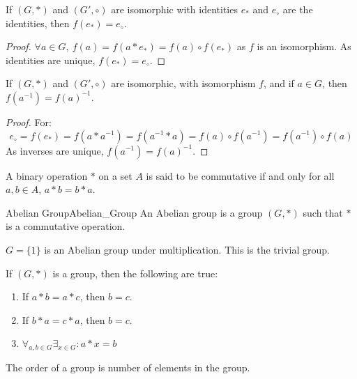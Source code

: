     \begin{theorem}
        If $(G,*)$ and $(G',\circ)$ are isomorphic with identities $e_{*}$
        and $e_{\circ}$ are the identities, then $f(e_{*})=e_{\circ}$.
    \end{theorem}
    \begin{proof}
        $\forall a\in G,\ f(a)=f(a* e_*) = f(a)\circ f(e_*)$ as $f$ is
        an isomorphism. As identities are unique, $f(e_*)=e_{\circ}$.
    \end{proof}
    \begin{theorem}
        If $(G,*)$ and $(G',\circ)$ are isomorphic, with isomorphism $f$, and if
        $a\in{G}$, then $f(a^{\minus{1}})=f(a)^{\minus{1}}$.
    \end{theorem}
    \begin{proof}
        For:
        \begin{equation}
            e_{\circ}=f(e_*)
                     =f(a*a^{-1})
                     =f(a^{-1}*a)
                     =f(a)\circ f(a^{-1})
                     =f(a^{-1})\circ f(a)
        \end{equation}
        As inverses are unique, $f(a^{-1})=f(a)^{-1}$.
    \end{proof}
    \begin{definition}
    A binary operation $*$ on a set $A$ is said to be commutative if and only for all $a,b\in A$, $a*b = b*a$.
    \end{definition}
    \begin{fdefinition}{Abelian Group}{Abelian_Group}
        An \gls{Abelian group} is a \gls{group} $(G,*)$ such that $*$ is
        a \gls{commutative operation}.
    \end{fdefinition}
    \begin{example}
        $G=\{1\}$ is an Abelian group under multiplication.
        This is the trivial group.
    \end{example}
    \begin{theorem}
        If $(G,*)$ is a group, then the following are true:
        \begin{enumerate}
            \item If $a*b=a*c$, then $b=c$.
            \item If $b*a=c*a$, then $b=c$.
            \item $\forall_{{a,b}\in{G}}\exists_{{x}\in{G}}:a*x=b$
        \end{enumerate}
    \end{theorem}
    \begin{definition}
        The order of a group is number of elements in the
        group.
    \end{definition}
